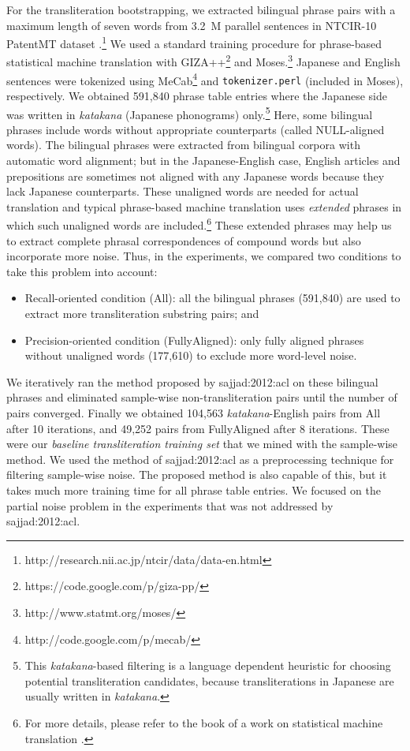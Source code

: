 \documentclass[english]{jnlp_1.4}
\makeatletter
\def\@{}
\newcommand{\newcite}{}
\makeatother
\begin{document}
For the transliteration bootstrapping,
we extracted bilingual phrase pairs with a maximum length of seven words
from 3.2~M parallel sentences in NTCIR-10 PatentMT dataset {\cite{goto:2013:ntcir}}.\footnote{
http://research.nii.ac.jp/ntcir/data/data-en.html}\@ 
We used a standard training procedure for phrase-based statistical machine translation \cite{koehn:2003:naacl}
with GIZA++\footnote{https://code.google.com/p/giza-pp/} and Moses.\footnote{http://www.statmt.org/moses/}\@ 
Japanese and English sentences were tokenized using MeCab\footnote{http://code.google.com/p/mecab/}
and {\tt tokenizer.perl} (included in Moses), respectively.
We obtained 591,840 phrase table entries where the Japanese side was written in {\it katakana} (Japanese phonograms)
only.\footnote{
This {\it katakana}-based filtering is a language dependent heuristic for choosing potential transliteration candidates,
because transliterations in Japanese are usually written in {\it katakana}.}\@ 
Here, some bilingual phrases include words without appropriate counterparts (called NULL-aligned words).
The bilingual phrases were extracted from bilingual corpora with automatic word alignment;
but in the Japanese-English case, English articles and prepositions are sometimes not aligned with any Japanese words
because they lack Japanese counterparts.
These unaligned words are needed for actual translation and
typical phrase-based machine translation uses {\em extended} phrases
in which such unaligned words are included.\footnote{For more details,
please refer to the book of a work on statistical machine translation \cite{koehn:smtbook}.}\@ 
These extended phrases may help us to extract complete phrasal correspondences of compound words
but also incorporate more noise.
Thus, in the experiments, we compared two conditions to take this problem into account:
\begin{itemize}
\item Recall-oriented condition ({\sc All}): all the bilingual phrases (591,840) are used to extract more transliteration substring pairs; and
\item Precision-oriented condition ({\sc FullyAligned}): only fully aligned phrases without unaligned words (177,610) to exclude more word-level noise.
\end{itemize}

We iteratively ran the method proposed by \newcite{sajjad:2012:acl} on these bilingual phrases
and eliminated sample-wise non-transliteration pairs until the number of pairs converged.
Finally we obtained 104,563 {\it katakana}-English pairs from {\sc All} after 10 iterations,
and 49,252 pairs from {\sc FullyAligned} after 8 iterations.
These were our {\em baseline transliteration training set} that we mined with the sample-wise method.
We used the method of \newcite{sajjad:2012:acl} as a preprocessing technique for filtering sample-wise noise.
The proposed method is also capable of this,
but it takes much more training time for all phrase table entries.
We focused on the partial noise problem in the experiments
that was not addressed by \newcite{sajjad:2012:acl}.
\end{document}
